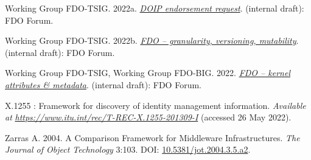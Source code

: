\begin{CSLReferences}{1}{0}
\leavevmode{}%
Working Group FDO-TSIG. 2022a. \emph{\href{https://docs.google.com/document/d/1me0L8C5yDe39cYP1Sxud4Y10hxhphOimLB-K-KgHQUk/edit}{DOIP endorsement request}}. (internal draft): FDO Forum.

\leavevmode{}%
Working Group FDO-TSIG. 2022b. \emph{\href{https://docs.google.com/document/d/1VJTYHxLXIbjHSoFnMEkKaTbpTz9CagoIJyoSafkVh_I/edit}{FDO -- granularity, versioning, mutability}}. (internal draft): FDO Forum.

\leavevmode{}%
Working Group FDO-TSIG, Working Group FDO-BIG. 2022. \emph{\href{https://docs.google.com/document/d/11CuSoNOpg3vYaoHqi4Yg6ncP3qOclJIC/edit}{FDO -- kernel attributes \& metadata}}. (internal draft): FDO Forum.

\leavevmode{}%
X.1255 : Framework for discovery of identity management information. \emph{Available at} \href{https://www.itu.int/rec/T-REC-X.1255-201309-I}{\emph{https://www.itu.int/rec/T-REC-X.1255-201309-I}} (accessed 26 May 2022).

\leavevmode{}%
Zarras A. 2004. A Comparison Framework for Middleware Infrastructures. \emph{The Journal of Object Technology} 3:103. DOI: \href{https://doi.org/10.5381/jot.2004.3.5.a2}{10.5381/jot.2004.3.5.a2}.

\end{CSLReferences}
